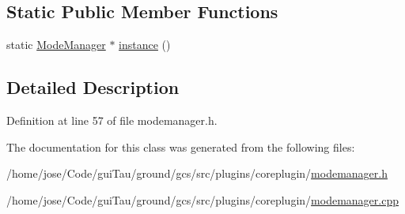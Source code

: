 \subsection*{Static Public Member Functions}
\begin{DoxyCompactItemize}
\item 
static \hyperlink{class_core_1_1_mode_manager}{Mode\-Manager} $\ast$ \hyperlink{group___core_plugin_ga756ec59f5104cce0abf8a6990a2bba2c}{instance} ()
\end{DoxyCompactItemize}


\subsection{Detailed Description}


Definition at line 57 of file modemanager.\-h.



The documentation for this class was generated from the following files\-:\begin{DoxyCompactItemize}
\item 
/home/jose/\-Code/gui\-Tau/ground/gcs/src/plugins/coreplugin/\hyperlink{modemanager_8h}{modemanager.\-h}\item 
/home/jose/\-Code/gui\-Tau/ground/gcs/src/plugins/coreplugin/\hyperlink{modemanager_8cpp}{modemanager.\-cpp}\end{DoxyCompactItemize}
